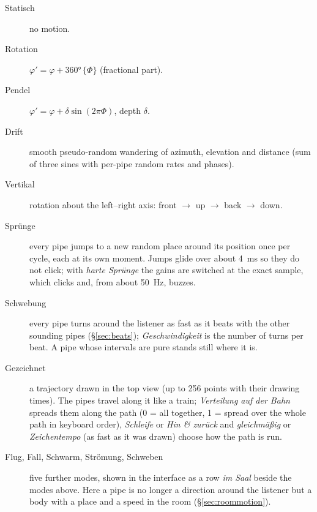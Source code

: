 \documentclass[11pt,a4paper,parskip=half,DIV=11,toc=bibliography]{scrartcl}
\newcommand{\ui}[1]{\emph{#1}}                 %
\begin{document}
\begin{description}
  \item[Statisch] no motion.
  \item[Rotation] $\varphi' = \varphi + 360°\,\{\Phi\}$ (fractional part).
  \item[Pendel] $\varphi' = \varphi + \delta\sin(2\pi\Phi)$, depth $\delta$.
  \item[Drift] smooth pseudo-random wandering of azimuth, elevation and distance (sum of three
        sines with per-pipe random rates and phases).
  \item[Vertikal] rotation about the left--right axis: front $\rightarrow$ up $\rightarrow$ back
        $\rightarrow$ down.
  \item[Sprünge] every pipe jumps to a new random place around its position once per cycle, each at its
        own moment. Jumps glide over about \SI{4}{ms} so they do not click; with \ui{harte Sprünge} the
        gains are switched at the exact sample, which clicks and, from about \SI{50}{Hz}, buzzes.
  \item[Schwebung] every pipe turns around the listener as fast as it beats with the other sounding pipes
        (\S\ref{sec:beats}); \ui{Geschwindigkeit} is the number of turns per beat. A pipe whose intervals are pure stands
        still where it is.
  \item[Gezeichnet] a trajectory drawn in the top view (up to 256 points with their drawing times). The
        pipes travel along it like a train; \ui{Verteilung auf der Bahn} spreads them along the path
        (0 = all together, 1 = spread over the whole path in keyboard order), \ui{Schleife} or
        \ui{Hin \& zurück} and \ui{gleichmäßig} or \ui{Zeichentempo} (as fast as it was drawn) choose
        how the path is run.
  \item[Flug, Fall, Schwarm, Strömung, Schweben] five further modes, shown in the interface as a row \ui{im Saal} beside the modes above.
        Here a pipe is no longer a direction around the listener but a body with a place and a speed in the room
        (\S\ref{sec:roommotion}).
\end{description}
\end{document}
